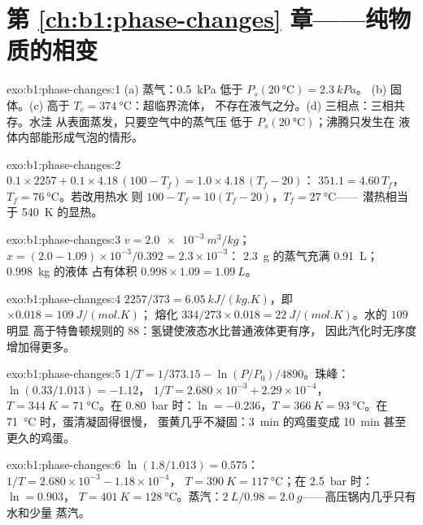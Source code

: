 \section*{第 \ref{ch:b1:phase-changes} 章——纯物质的相变}

\begin{solution}{exo:b1:phase-changes:1}
(a) 蒸气：\qty{0.5}{kPa} 低于 $P_s(\qty{20}{\degreeCelsius}) = \qty{2.3}{kPa}$。
(b) 固体。(c) 高于 $T_c = \qty{374}{\degreeCelsius}$：超临界流体，
不存在液气之分。(d) 三相点：三相共存。水洼
从表面蒸发，只要空气中的蒸气压
低于 $P_s(\qty{20}{\degreeCelsius})$；沸腾只发生在
液体内部能形成气泡的情形。
\end{solution}

\begin{solution}{exo:b1:phase-changes:2}
$0.1 \times 2257 + 0.1 \times 4.18\,(100 - T_f) = 1.0 \times 4.18\,(T_f - 20)$：
$351.1 = 4.60\,T_f$，$T_f = \qty{76}{\degreeCelsius}$。若改用热水
则 $100 - T_f = 10(T_f - 20)$，$T_f = \qty{27}{\degreeCelsius}$——
潜热相当于 \qty{540}{K} 的显热。
\end{solution}

\begin{solution}{exo:b1:phase-changes:3}
$v = \qty{2.0e-3}{m^3/kg}$；$x = (2.0 - 1.09) \times 10^{-3}/0.392 = 2.3 \times 10^{-3}$：
\qty{2.3}{g} 的蒸气充满 \qty{0.91}{L}；\qty{0.998}{kg} 的液体
占有体积 $0.998 \times 1.09 = \qty{1.09}{L}$。
\end{solution}

\begin{solution}{exo:b1:phase-changes:4}
$2257/373 = \qty{6.05}{kJ/(kg.K)}$，即 $\times 0.018 = \qty{109}{J/(mol.K)}$；
熔化 $334/273 \times 0.018 = \qty{22}{J/(mol.K)}$。水的 $109$ 明显
高于特鲁顿规则的 $88$：氢键使液态水比普通液体更有序，
因此汽化时无序度增加得更多。
\end{solution}

\begin{solution}{exo:b1:phase-changes:5}
$1/T = 1/373.15 - \ln(P/P_0)/4890$。珠峰：$\ln(0.33/1.013) = -1.12$，
$1/T = 2.680 \times 10^{-3} + 2.29 \times 10^{-4}$，$T = \qty{344}{K} =
\qty{71}{\degreeCelsius}$。在 \qty{0.80}{bar} 时：$\ln = -0.236$，$T = \qty{366}{K} =
\qty{93}{\degreeCelsius}$。在 \qty{71}{\degreeCelsius} 时，蛋清凝固得很慢，
蛋黄几乎不凝固：\qty{3}{min} 的鸡蛋变成
\qty{10}{min} 甚至更久的鸡蛋。
\end{solution}

\begin{solution}{exo:b1:phase-changes:6}
$\ln(1.8/1.013) = 0.575$：$1/T = 2.680 \times 10^{-3} - 1.18 \times 10^{-4}$，
$T = \qty{390}{K} = \qty{117}{\degreeCelsius}$；在 \qty{2.5}{bar} 时：$\ln = 0.903$，
$T = \qty{401}{K} = \qty{128}{\degreeCelsius}$。蒸汽：$\qty{2}{L}/0.98 =
\qty{2.0}{g}$——高压锅内几乎只有水和少量
蒸汽。
\end{solution}

